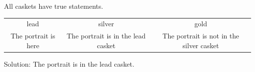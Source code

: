 All caskets have true statements.
\begin{tabular}{ccc}
\toprule
lead & silver & gold\\
The portrait is here & The portrait is in the lead casket & The portrait is not in the silver casket\\
\bottomrule
\end{tabular}
Solution: The portrait is in the lead casket.